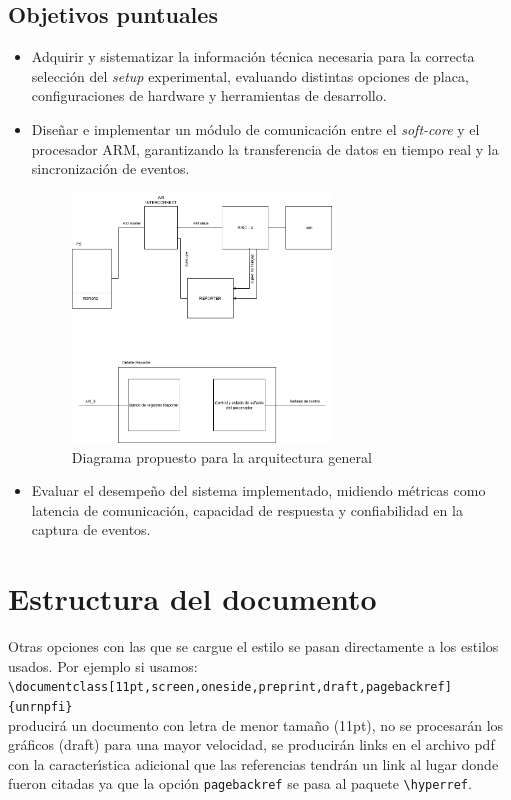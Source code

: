 \subsection{Objetivos puntuales}

\begin{itemize}
\item Adquirir y sistematizar la información técnica necesaria para la correcta selección del \textit{setup} experimental, evaluando distintas opciones de placa, configuraciones de hardware y herramientas de desarrollo.
        
\item Diseñar e implementar un módulo de comunicación entre el \textit{soft-core} y el procesador ARM, garantizando la transferencia de datos en tiempo real y la sincronización de eventos.

\begin{figure}[H]
		\centering
		\includegraphics[width=0.65\textwidth]{figs/Diagram_architecture_general.png}
		\caption{Diagrama propuesto para la arquitectura general}
		\label{fig1}
	\end{figure}

\item Evaluar el desempeño del sistema implementado, midiendo métricas como latencia de comunicación, capacidad de respuesta y confiabilidad en la captura de eventos.
\end{itemize}

\section{Estructura del documento}
\label{S:otras-opciones}
Otras opciones con las que se cargue el estilo se pasan directamente a los estilos usados. Por ejemplo si usamos:\\
\verb|\documentclass[11pt,screen,oneside,preprint,draft,pagebackref]{unrnpfi}|\\
producir\'{a} un documento con letra de menor tama\~{n}o (11pt), no se procesar\'{a}n los gr\'{a}ficos (draft) para una mayor velocidad, se producir\'{a}n links en el archivo pdf con la caracter\'{\i}stica adicional que las referencias tendr\'{a}n un link al lugar donde fueron citadas ya que la opci\'{o}n \verb|pagebackref| se pasa al paquete \verb|\hyperref|.

